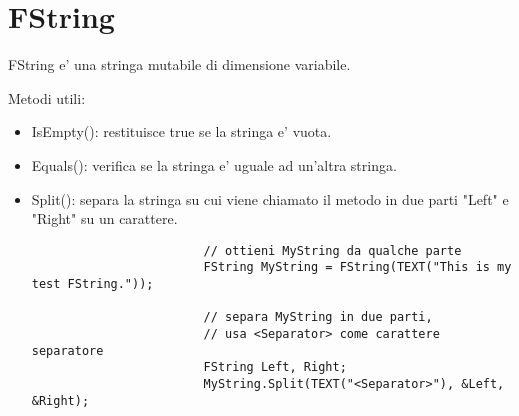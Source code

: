     \section{FString}
        FString e' una stringa mutabile di dimensione variabile.

        Metodi utili:
        \begin{itemize}
            \item IsEmpty(): restituisce true se la stringa e' vuota.

            \item Equals(): verifica se la stringa e' uguale ad un'altra stringa.

            \item Split(): separa la stringa su cui viene chiamato il metodo in due parti "Left" e "Right" su un carattere.

                \begin{examplebox}
                    \begin{verbatim}
                        // ottieni MyString da qualche parte
                        FString MyString = FString(TEXT("This is my test FString."));

                        // separa MyString in due parti,
                        // usa <Separator> come carattere separatore
                        FString Left, Right;
                        MyString.Split(TEXT("<Separator>"), &Left, &Right);
                    \end{verbatim}
                \end{examplebox}
        \end{itemize}
